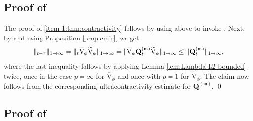 \documentclass[11pt]{article}
\makeatletter
\numberwithin{equation}{section}
\DeclareRobustCommand{\mathds}[1]{\csname jepbb@#1\endcsname}
\theoremstyle{plain}
\theoremstyle{definition}
\newcommand{\J}{\mathds{Q}}
\newcommand{\m}{\mathfrak{m}}
\newcommand{\Q}[1][\mo]{\mathbf{Q}^{({#1})}}
\let\mo\mu
\makeatother
\begin{document}
\subsection{Proof of }

The proof of \eqref{item-1:thm:contractivity} follows by using  above to invoke \cite[Th.\,8]{Patie-Miclo}. Next, by  and using Proposition \ref{prop:cmir}, we get
\begin{equation*}
\|\J_{t+\tau}\|_{1\to\infty} = \|\J_t \overline{\mathrm{V}}_\phi \widetilde{\mathrm{V}}_\phi\|_{1\to\infty} = \|\overline{\mathrm{V}}_\phi \Q[\m]_t \widetilde{\mathrm{V}}_\phi\|_{1\to\infty} \leq \|\Q[\m]_t\|_{1\to\infty},
\end{equation*}
where the last inequality follows by applying Lemma \ref{lem:Lambda-L2-bounded} twice, once in the case \hbox{$p=\infty$} for $\overline{\mathrm{V}}_\phi$ and once with $p=1$ for $\widetilde{\mathrm{V}}_\phi$. The claim now follows from the corresponding ultracontractivity estimate for $\Q[\m]$. \qed

\subsection{Proof of }
\end{document}
